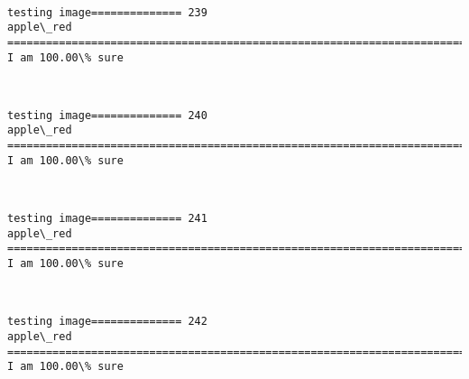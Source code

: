 \documentclass[11pt]{article}
\begin{document}
    \begin{center}
    \end{center}
    { \hspace*{\fill} \\}
    
    \begin{Verbatim}[commandchars=\\\{\}]
testing image============== 239
apple\_red
============================================================================
I am 100.00\% sure

    \end{Verbatim}

    \begin{center}
    \end{center}
    { \hspace*{\fill} \\}
    
    \begin{Verbatim}[commandchars=\\\{\}]
testing image============== 240
apple\_red
============================================================================
I am 100.00\% sure

    \end{Verbatim}

    \begin{center}
    \end{center}
    { \hspace*{\fill} \\}
    
    \begin{Verbatim}[commandchars=\\\{\}]
testing image============== 241
apple\_red
============================================================================
I am 100.00\% sure

    \end{Verbatim}

    \begin{center}
    \end{center}
    { \hspace*{\fill} \\}
    
    \begin{Verbatim}[commandchars=\\\{\}]
testing image============== 242
apple\_red
============================================================================
I am 100.00\% sure

    \end{Verbatim}
\end{document}
